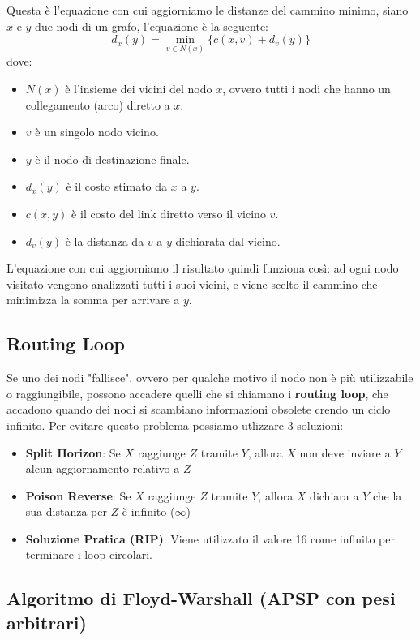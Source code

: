 \noindent Questa è l'equazione con cui aggiorniamo le distanze del cammino minimo, siano $x$ e $y$ due nodi di un grafo,
l'equazione è la seguente:
\[ d_x (y) = \underset{v \in N(x)}{\min} \{ c(x, v)+ d_v (y)\}  \]
dove:
\begin{itemize}
    \item $N(x)$ è l'insieme dei vicini del nodo $x$, ovvero tutti i nodi che hanno un collegamento (arco) diretto a $x$.
    \item $v$ è un singolo nodo vicino.
    \item $y$ è il nodo di destinazione finale.
    \item $d_x(y)$ è il costo stimato da $x$ a $y$.
    \item $c(x,y)$ è il costo del link diretto verso il vicino $v$.
    \item $d_v(y)$ è la distanza da $v$ a $y$ dichiarata dal vicino. 
\end{itemize}

\noindent L'equazione con cui aggiorniamo il risultato quindi funziona così: ad ogni nodo visitato vengono analizzati 
tutti i suoi vicini, e viene scelto il cammino che minimizza la somma per arrivare a $y$.

\subsection{Routing Loop}
Se uno dei nodi "fallisce", ovvero per qualche motivo il nodo non è più utilizzabile o raggiungibile, possono accadere quelli che si chiamano i \textbf{routing loop}, che accadono quando 
dei nodi si scambiano informazioni obsolete crendo un ciclo infinito. Per evitare questo problema possiamo utlizzare 3 soluzioni:
\begin{itemize}
    \item \textbf{Split Horizon}: Se $X$ raggiunge $Z$ tramite $Y$, allora $X$ non deve inviare a $Y$ alcun aggiornamento relativo a $Z$
    \item \textbf{Poison Reverse}: Se $X$ raggiunge $Z$ tramite $Y$, allora $X$ dichiara a $Y$ che la sua distanza per $Z$ è infinito ($\infty$)
    \item \textbf{Soluzione Pratica (RIP)}: Viene utilizzato il valore 16 come infinito per terminare i loop circolari.
\end{itemize} 


\subsection{Algoritmo di Floyd-Warshall (APSP con pesi arbitrari)}

